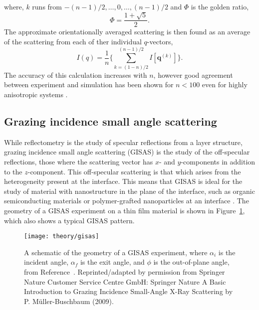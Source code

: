 %
where, $k$ runs from $-(n-1)/2,\ldots,0,\ldots,(n-1)/2$ and $\Phi$ is the golden ratio,
%
\begin{equation}
    \Phi = \frac{1+\sqrt{5}}{2}.
\end{equation}
%
The approximate orientationally averaged scattering is then found as an average of the scattering from each of ther individual $q$-vectors,
%
\begin{equation}
    I(q) = \frac{1}{n}\Bigg\{\sum_{k=(1-n)/2}^{(n-1)/2} I[\mathbf{q}^{(k)}]\Bigg\}.
\end{equation}
%
The accuracy of this calculation increases with $n$, however good agreement between experiment and simulation has been shown for $n < 100$ even for highly anisotropic systems \cite{watson_rapid_2013}.


\subsection{Grazing incidence small angle scattering}

While reflectometry is the study of specular reflections from a layer structure, grazing incidence small angle scattering (GISAS) is the study of the off-specular reflections, those where the scattering vector has $x$- and $y$-components in addition to the $z$-component.
This off-specular scattering is that which arises from the heterogeneity present at the interface.
This means that GISAS is ideal for the study of material with nanostructure in the plane of the interface, such as organic semiconducting materials or polymer-grafted nanoparticles at an interface \cite{muller-buschbaum_local_2005,zhang_ion-specific_2017}.
The geometry of a GISAS experiment on a thin film material is shown in Figure~\ref{fig:gisas}, which also shows a typical GISAS pattern.
%
\begin{figure}
    \centering
    \texttt{[image: theory/gisas]}
    \caption{A schematic of the geometry of a GISAS experiment, where $\alpha_i$ is the incident angle, $\alpha_f$ is the exit angle, and $\phi$ is the out-of-plane angle, from Reference~\cite{muller-buschbaum_basic_2009}. Reprinted/adapted by permission from Springer Nature Customer Service Centre GmbH: Springer Nature A Basic Introduction to Grazing Incidence Small-Angle X-Ray Scattering by P. M\"{u}ller-Buschbaum\textsuperscript{\textcopyright} (2009).}
    \label{fig:gisas}
\end{figure}
%

